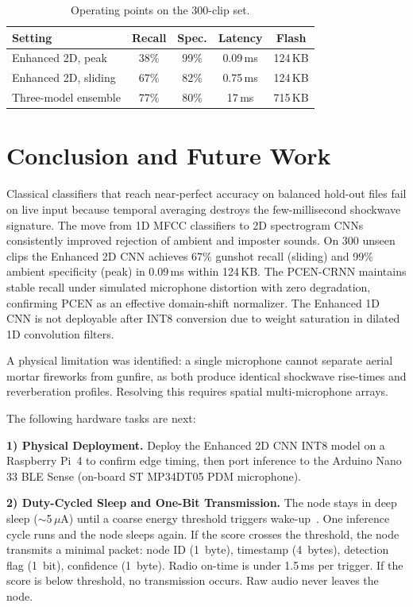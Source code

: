 \documentclass[conference]{IEEEtran}
\begin{document}
\begin{table}[!t]
\centering
\caption{Operating points on the 300-clip set.}
\label{tab:paradigm}
\footnotesize
\begin{tabular}{lcccc}
\toprule
\textbf{Setting} & \textbf{Recall} & \textbf{Spec.} & \textbf{Latency} & \textbf{Flash} \\
\midrule
Enhanced 2D, peak & 38\% & 99\% & 0.09\,ms & 124\,KB \\
Enhanced 2D, sliding & 67\% & 82\% & 0.75\,ms & 124\,KB \\
Three-model ensemble & 77\% & 80\% & 17\,ms & 715\,KB \\
\bottomrule
\end{tabular}
\end{table}

\section{Conclusion and Future Work}
\label{sec:conclusion}

Classical classifiers that reach near-perfect accuracy on balanced hold-out files fail on live input because temporal averaging destroys the few-millisecond shockwave signature. The move from 1D MFCC classifiers to 2D spectrogram CNNs consistently improved rejection of ambient and imposter sounds. On 300 unseen clips the Enhanced 2D CNN achieves 67\% gunshot recall (sliding) and 99\% ambient specificity (peak) in 0.09\,ms within 124\,KB. The PCEN-CRNN maintains stable recall under simulated microphone distortion with zero degradation, confirming PCEN as an effective domain-shift normalizer. The Enhanced 1D CNN is not deployable after INT8 conversion due to weight saturation in dilated 1D convolution filters.

A physical limitation was identified: a single microphone cannot separate aerial mortar fireworks from gunfire, as both produce identical shockwave rise-times and reverberation profiles. Resolving this requires spatial multi-microphone arrays.

The following hardware tasks are next:

\textbf{1) Physical Deployment.} Deploy the Enhanced 2D CNN INT8 model on a Raspberry Pi~4 to confirm edge timing, then port inference to the Arduino Nano 33 BLE Sense (on-board ST MP34DT05 PDM microphone).

\textbf{2) Duty-Cycled Sleep and One-Bit Transmission.} The node stays in deep sleep ($\sim$5\,$\mu$A) until a coarse energy threshold triggers wake-up~\cite{edgeimpulse2024}. One inference cycle runs and the node sleeps again. If the score crosses the threshold, the node transmits a minimal packet: node ID (1~byte), timestamp (4~bytes), detection flag (1~bit), confidence (1~byte). Radio on-time is under 1.5\,ms per trigger. If the score is below threshold, no transmission occurs. Raw audio never leaves the node.
\end{document}

